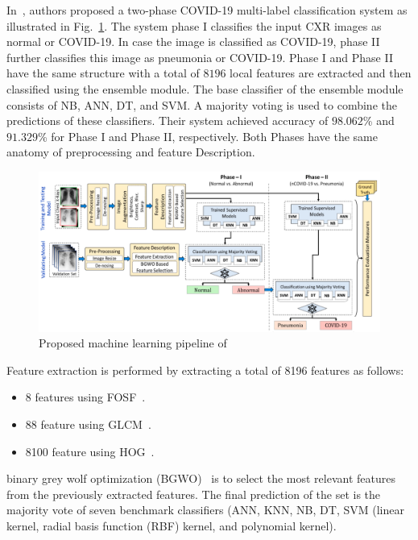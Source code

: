 In~\cite{acos}, authors proposed a two-phase COVID-19 multi-label classification system as illustrated in Fig.~\ref{fig:Acos}. The system phase I classifies the input CXR images as normal or COVID-19. In case the image is classified as COVID-19, phase II further classifies this image as pneumonia or COVID-19. Phase I and Phase II have the same structure with a total of $8196$  local features are extracted and then classified using the ensemble module. The base classifier of the ensemble module consists of NB, ANN, DT, and SVM. A majority voting is used to combine the predictions of these classifiers. Their system achieved accuracy of $98.062$\%  and $91.329$\% for Phase I and Phase II, respectively. Both Phases have the same anatomy of preprocessing and feature Description.
\begin{figure}
    \begin{center}
        \includegraphics[width=\textwidth]{Figures/ACoS.png}
        \caption{\label{fig:Acos} Proposed machine learning pipeline of~\cite{acos}}
    \end{center}
\end{figure}
Feature extraction is performed by extracting a total of 8196 features as follows:
\begin{itemize}
    \item 8 features using FOSF~\cite{srinivasan2008statistical}.
    \item 88 feature using GLCM~\cite{gomez2012analysis}.
    \item 8100 feature using HOG~\cite{dalal2005histograms}.
\end{itemize}
binary grey wolf optimization (BGWO)~\cite{mirjalili2014grey} is to select the most relevant features from the previously extracted features. The final prediction of the set is the majority vote of seven benchmark classifiers (ANN, KNN, NB, DT, SVM (linear kernel, radial basis function (RBF) kernel, and polynomial kernel).



